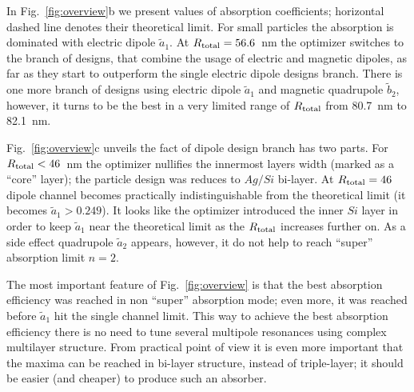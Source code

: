 \documentclass[aps,prl,twocolumn,showpacs,superscriptaddress,groupedaddress]{revtex4-1}
\begin{document}
In Fig.~\ref{fig:overview}b we present values of absorption
coefficients; horizontal dashed line denotes their theoretical limit.
For small particles the absorption is dominated with electric dipole
$\tilde{a}_1$.  At $R_{\rm total} = 56.6$~nm the optimizer switches to
the branch of designs, that combine the usage of electric and magnetic
dipoles, as far as they start to outperform the single electric dipole
designs branch.  There is one more branch of designs using electric
dipole $\tilde{a}_1$ and magnetic quadrupole $\tilde{b}_2$, however,
it turns to be the best in a very limited range of $R_{\rm total}$ from
80.7~nm to 82.1~nm.

Fig.~\ref{fig:overview}c unveils the fact of dipole design branch has
two parts. For $R_{\rm total}<46$~nm the optimizer nullifies the
innermost layers width (marked as a ``core'' layer); the particle
design was reduces to $Ag/Si$ bi-layer.  At $R_{\rm total}=46$ dipole
channel becomes practically indistinguishable from the theoretical
limit (it becomes $\tilde{a}_1>0.249$).  It looks like the optimizer
introduced the inner $Si$ layer in order to keep $\tilde{a}_1$ near
the theoretical limit as the $R_{\rm total}$ increases further on.  As
a side effect quadrupole $\tilde{a}_2$ appears, however, it do not
help to reach ``super'' absorption limit $n=2$.

The most important feature of Fig.~\ref{fig:overview} is that the best
absorption efficiency was reached in non ``super'' absorption mode;
even more, it was reached before $\tilde{a}_1$ hit the single channel
limit.  This way to achieve the best absorption efficiency there is no
need to tune several multipole resonances using complex multilayer
structure.  From practical point of view it is even more important that
the maxima can be reached in bi-layer structure, instead of
triple-layer; it should be easier (and cheaper) to produce such an
absorber.
\end{document}
